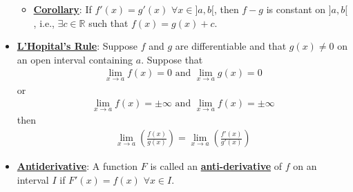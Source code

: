 \documentclass[reqno,11pt]{amsart}
\theoremstyle{definition}
\theoremstyle{remark}
\newcommand{\R}{\mathbb{R}}
\newcommand{\dfn}[1]{\underline{\textbf{#1}}}
\begin{document}
\begin{itemize}[noitemsep]
	\begin{itemize}[noitemsep]
		\item \dfn{Corollary}: If $f'(x) = g'(x)$ $\forall x \in ]a,b[$, then $f-g$ is constant on $]a,b[$, i.e., $\exists c \in \R$ such that $f(x) = g(x) +c$. 
	\end{itemize}
	\item \dfn{L'Hopital's Rule}: Suppose $f$ and $g$ are differentiable and that $g(x) \neq 0$ on an open interval containing $a$. Suppose that
	\begin{align}
		\lim_{x \rightarrow a} f(x) = 0 \text{ and } \lim_{x \rightarrow a} g(x) = 0 	
	\end{align}
	or
	\begin{align}
		\lim_{x \rightarrow a} f(x) = \pm \infty \text{ and } \lim_{x \rightarrow a} f(x)  = \pm \infty 	
	\end{align}
	then
	\begin{align}
		\lim_{x \rightarrow a} \left( \frac{f(x)}{g(x)} \right) = \lim_{ x \rightarrow a} \left( \frac{f'(x)}{g'(x)}	\right) 
	\end{align}
	\item \dfn{Antiderivative}: A function $F$ is called an \dfn{anti-derivative} of $f$ on an interval $I$ if $F'(x) = f(x)$ $\forall x \in I$. 
\end{itemize}
\end{document}
